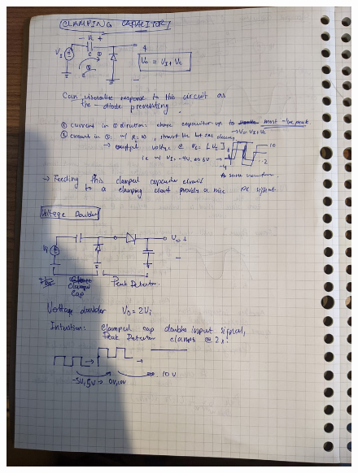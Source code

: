 \documentclass[../notes.tex]{subfiles}
\begin{document}
\begin{fullpage}
	\begin{figure}[H]
		\centering
		\includegraphics[width=\linewidth]{img/image_2022-09-29-16-36-25.png}
	\end{figure}
\end{fullpage}
\end{document}
